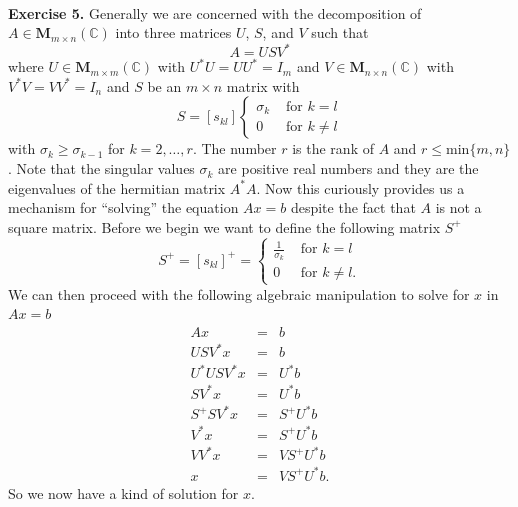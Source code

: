 \documentclass[12pt]{amsart}
\begin{document}
\begin{onehalfspace}
        \qquad\\
        \textbf{Exercise 5.} Generally we are concerned with the decomposition of
        $A\in\mathbf{M}_{m\times n}(\mathbb{C})$ into three matrices $U$, $S$, and $V$ such that
        \begin{displaymath}
            A = USV^*
        \end{displaymath}
        where $U\in\mathbf{M}_{m\times m}(\mathbb{C})$ with $U^* U=UU^*=I_m$ and $V\in\mathbf{M}_{n\times n}(\mathbb{C})$
        with $V^* V = VV^* = I_n$ and $S$ be an $m\times n$ matrix with
        \begin{displaymath}
            S = [s_{kl}]
            \begin{cases}
                \sigma_k & \text{ for } k = l\\
                0 & \text{ for } k \neq l
            \end{cases}
        \end{displaymath}
        with $\sigma_k \ge \sigma_{k-1}$ for $k=2,\ldots,r$.
        The number $r$ is the rank of $A$ and $r\le\text{min}\{m,n\}$.
        Note that the singular values $\sigma_k$ are positive real numbers and they are the eigenvalues of the
        hermitian matrix $A^* A$.
        Now this curiously provides us a mechanism for ``solving'' the equation $Ax=b$ despite the fact that $A$ is not
        a square matrix.
        Before we begin we want to define the following matrix $S^+$
        \begin{displaymath}
            S^+ = [s_{kl}]^+ =
            \begin{cases}
                \frac{1}{\sigma_k} & \text{ for } k = l\\
                0 & \text{ for } k \neq l.
            \end{cases}
        \end{displaymath}
        We can then proceed with the following algebraic manipulation to solve for $x$ in $Ax=b$
        \begin{eqnarray*}
            Ax  & = & b \\
            USV^* x & =  & b \\
            U^* USV^* x & = & U^* b\\
            SV^* x & = & U^* b\\
            S^+ SV^* x & = & S^+ U^* b\\
            V^* x & = & S^+ U^* b\\
            VV^* x & = & VS^+ U^* b\\
            x & = & VS^+ U^* b.
        \end{eqnarray*}
        So we now have a kind of solution for $x$.


\end{onehalfspace}
\end{document}
